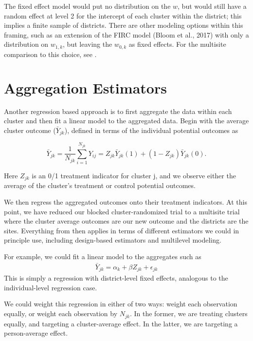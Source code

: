 \documentclass[12pt]{article}
\begin{document}
The fixed effect model would put no distribution on the $w$, but would still have a random effect at level 2 for the intercept of each cluster within the district; this implies a finite sample of districts.
There are other modeling options within this framing, such as an extension of the FIRC model (Bloom et al., 2017) with only a distribution on $w_{1,k}$, but leaving the $w_{0,k}$ as fixed effects.
For the multisite comparison to this choice, see \cite{miratrix2021applied}.






\section{Aggregation Estimators}\label{aggregation-estimators}

Another regression based approach is to first aggregate the data within each
cluster and then fit a linear model to the aggregated data.
Begin with the average cluster outcome ($\bar{Y}_{jk}$), defined in terms of the individual potential outcomes as

\[ \bar{Y}_{jk} = \frac{1}{N_{jk}}  \sum_{i=1}^{N_{jk}} Y_{ij} = Z_{jk} \bar{Y}_{jk}(1) + (1-Z_{jk})\bar{Y}_{jk}(0) . \]

Here $Z_{jk}$ is an 0/1 treatment indicator for cluster j, and we observe either the average of the cluster's treatment or control potential outcomes.

We then regress the aggregated outcomes onto their treatment indicators.
At this point, we have reduced our blocked cluster-randomized trial to a multisite trial where the cluster average outcomes are our new outcome and the districts are the sites.
Everything from \cite{miratrix2021applied} then applies in terms of different estimators we could in principle use, including design-based estimators and multilevel modeling.

For example, we could fit a linear model to the aggregates such as
\begin{align*}
\bar{Y}_{jk} = \alpha_k + \beta Z_{jk} + \epsilon_{jk}
\end{align*}
This is simply a regression with district-level fixed effects, analogous to the individual-level regression case.

We could weight this regression in either of two ways: weight each observation equally, or weight each observation by $N_{jk}$.
In the former, we are treating clusters equally, and targeting a cluster-average effect.
In the latter, we are targeting a person-average effect.
\end{document}
